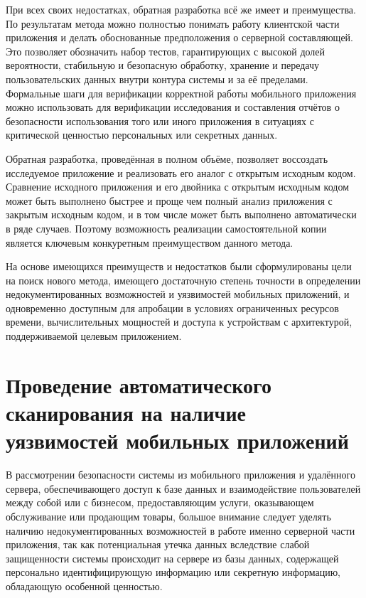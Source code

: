 При всех своих недостатках, обратная разработка всё же имеет и преимущества. По результатам метода можно полностью понимать работу клиентской части приложения и делать обоснованные предположения о серверной составляющей. Это позволяет обозначить набор тестов, гарантирующих с высокой долей вероятности, стабильную и безопасную обработку, хранение и передачу пользовательских данных внутри контура системы и за её пределами. Формальные шаги для верификации корректной работы мобильного приложения можно использовать для верификации исследования и составления отчётов о безопасности использования того или иного приложения в ситуациях с критической ценностью персональных или секретных данных.

Обратная разработка, проведённая в полном объёме, позволяет воссоздать исследуемое приложение и реализовать его аналог с открытым исходным кодом. Сравнение исходного приложения и его двойника с открытым исходным кодом может быть выполнено быстрее и проще чем полный анализ приложения с закрытым исходным кодом, и в том числе может быть выполнено автоматически в ряде случаев. Поэтому возможность реализации самостоятельной копии является ключевым конкуретным преимуществом данного метода.

На основе имеющихся преимуществ и недостатков были сформулированы цели на поиск нового метода, имеющего достаточную степень точности в определении недокументированных возможностей и уязвимостей мобильных приложений, и одновременно доступным для апробации в условиях ограниченных ресурсов времени, вычислительных мощностей и доступа к устройствам с архитектурой, поддерживаемой целевым приложением.

\section{Проведение автоматического сканирования на наличие уязвимостей мобильных приложений}

В рассмотрении безопасности системы из мобильного приложения и удалённого сервера, обеспечивающего доступ к базе данных и взаимодействие пользователей между собой или с бизнесом, предоставляющим услуги, оказывающем обслуживание или продающим товары, большое внимание следует уделять наличию недокументированных возможностей в работе именно серверной части приложения, так как потенциальная утечка данных вследствие слабой защищенности системы происходит на сервере из базы данных, содержащей персонально идентифицирующую информацию или секретную информацию, обладающую особенной ценностью.

